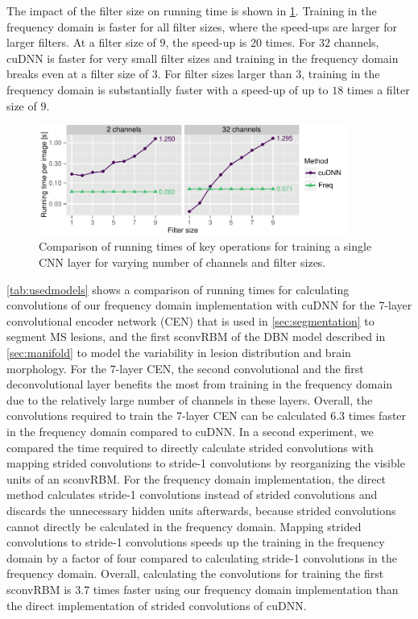 The impact of the filter size on running time is shown in \ref{fig:filtersize}.
Training in the frequency domain is faster for all filter sizes, where the
speed-ups are larger for larger filters. At a filter size of $9$, the speed-up
is 20 times. For $32$ channels, cuDNN is faster for very small filter sizes and
training in the frequency domain breaks even at a filter size of $3$.
For filter sizes larger than $3$, training in the frequency domain is
substantially faster with a speed-up of up to $18$ times a filter size of $9$.

\begin{figure}
\centering
\includegraphics[width=0.9\textwidth]{figures/filtersize}
\caption[Comparison of running times of key operations for training a single
CNN layer.]{Comparison of running times of key operations for training a single
CNN layer for varying number of channels and filter sizes.}
\label{fig:filtersize}
\end{figure}

\ref{tab:usedmodels} shows a comparison of running times for calculating
convolutions of our frequency domain implementation with cuDNN for the 7-layer
convolutional encoder network (CEN) that is used in \ref{sec:segmentation} to
segment MS lesions, and the first sconvRBM of the DBN model described in
\ref{sec:manifold} to model the variability in lesion distribution and brain
morphology. For the 7-layer CEN, the second convolutional and the first
deconvolutional layer benefits the most from training in the frequency domain
due to the relatively large number of channels in these layers. Overall, the
convolutions required to train the 7-layer CEN can be calculated 6.3 times
faster in the frequency domain compared to cuDNN. In a second experiment, we
compared the time required to directly calculate strided convolutions with
mapping strided convolutions to stride-1 convolutions by reorganizing the
visible units of an sconvRBM. For the frequency domain implementation, the
direct method calculates stride-1 convolutions instead of strided
convolutions and discards the unnecessary hidden units afterwards, because
strided convolutions cannot directly be calculated in the frequency domain.
Mapping strided convolutions to stride-1 convolutions speeds up the training in
the frequency domain by a factor of four compared to calculating stride-1
convolutions in the frequency domain. Overall, calculating the convolutions for
training the first sconvRBM is 3.7 times faster using our frequency domain
implementation than the direct implementation of strided convolutions of cuDNN.

